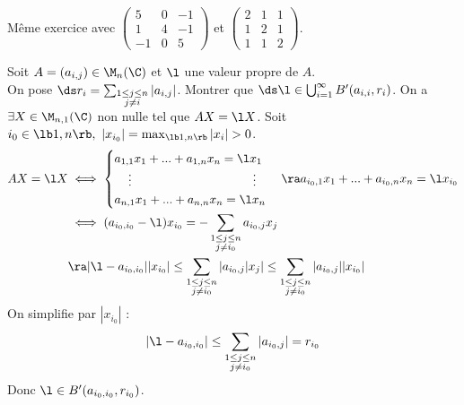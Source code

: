 \documentclass[11pt]{article}
\begin{document}
\begin{ex}{}{}
    Même exercice avec $\begin{pmatrix}5&0&-1\\1&4&-1\\-1&0&5\end{pmatrix}$ et $\begin{pmatrix}2&1&1\\1&2&1\\1&1&2\end{pmatrix}$.

\end{ex}

\begin{exercice}{}{}
    Soit $A=(a_{i,j})\in \M_n(\C)$ et $\l$ une valeur propre de $A$.\\
    On pose $\ds r_i=\sum_{\substack{1 \leq j \leq n \\ j \neq i}}|a_{i,j}|$. Montrer que $\ds \l \in \bigcup_{i=1}^{\infty}B'(a_{i,i}, r_i)$.
    \tcblower
    On a $\exists X \in \M_{n,1}(\C)$ non nulle tel que $AX=\l X$. Soit $i_0\in\lb1,n\rb, ~ |x_{i_0}|=\max_{\lb1,n\rb}|x_i|>0$.
    \begin{align*}
        AX=\l X &\iff \begin{cases} a_{1,1}x_1 + ... + a_{1,n}x_n = \l x_1 \\ \hspace*{0.4cm} \vdots \hspace*{3.5cm}\vdots \\ a_{n,1}x_1 + ... + a_{n,n}x_n = \l x_n \end{cases} \ra a_{i_0,1}x_1 + ... + a_{i_0,n}x_n = \l x_{i_0}\\
        &\iff (a_{i_0,i_0}-\l)x_{i_0} = -\sum_{\substack{1\leq j \leq n\\ j \neq i_0}}a_{i_0,j}x_j\\
        &\ra |\l - a_{i_0,i_0}||x_{i_0}| \leq \sum_{\substack{1\leq j \leq n \\ j \neq i_0}}|a_{i_0,j}|x_j| \leq \sum_{\substack{1\leq j \leq n\\j\neq i_0}}|a_{i_0,j}||x_{i_0}|
    \end{align*}
    On simplifie par $|x_{i_0}|$ : 
    \begin{equation*}
        |\l - a_{i_0,i_0}| \leq \sum_{\substack{1 \leq j \leq n \\ j \neq i_0}}|a_{i_0,j}| = r_{i_0}
    \end{equation*}
    Donc $\l \in B'(a_{i_0,i_0},r_{i_0})$.
\end{exercice}
\end{document}
